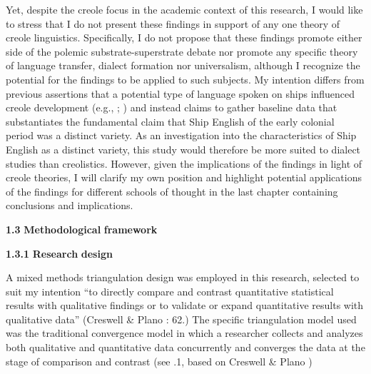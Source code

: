 \begin{styleNormali}
Yet, despite the creole focus in the academic context of this research, I would like to stress that I do not present these findings in support of any one theory of creole linguistics. Specifically, I do not propose that these findings promote either side of the polemic substrate-superstrate debate nor promote any specific theory of language transfer, dialect formation nor universalism, although I recognize the potential for the findings to be applied to such subjects. My intention differs from previous assertions that a potential type of language spoken on ships influenced creole development (e.g., \citealt{Reinecke1938}; \citealt{Hancock1972,19761972}) and instead claims to gather baseline data that substantiates the fundamental claim that Ship English of the early colonial period was a distinct variety. As an investigation into the characteristics of Ship English as a distinct variety, this study would therefore be more suited to dialect studies than creolistics. However, given the implications of the findings in light of creole theories, I will clarify my own position and highlight potential applications of the findings for different schools of thought in the last chapter containing conclusions and implications. 
\end{styleNormali}

\begin{styleNormali}
\textbf{1.3} \textbf{Methodological} \textbf{framework}
\end{styleNormali}

\begin{styleNormali}
  \textbf{1.3.1} \textbf{Research} \textbf{design}
\end{styleNormali}

\begin{styleNormali}
A mixed methods triangulation design was employed in this research, selected to suit my intention “to directly compare and contrast quantitative statistical results with qualitative findings or to validate or expand quantitative results with qualitative data” (Creswell \& Plano \citealt{Clark2007}: 62.) The specific triangulation model used was the traditional convergence model in which a researcher collects and analyzes both qualitative and quantitative data concurrently and converges the data at the stage of comparison and contrast (see .1, based on Creswell \& Plano \citealt{Clark2007})
\end{styleNormali}

